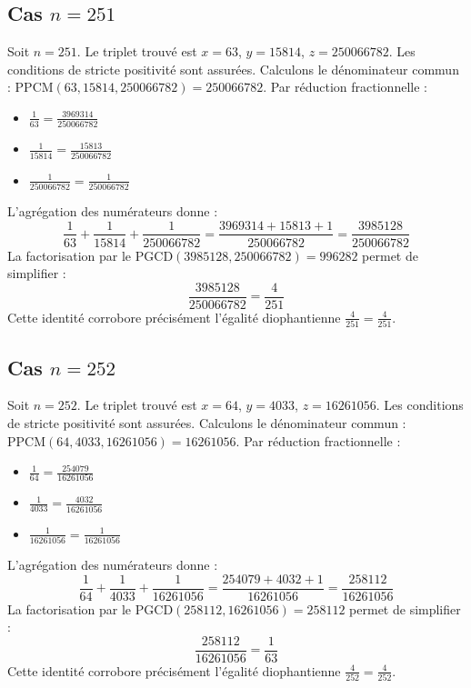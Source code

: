 \documentclass[11pt,a4paper]{article}
\begin{document}
\subsection{Cas $n = 251$}
Soit $n = 251$. Le triplet trouvé est $x = 63$, $y = 15814$, $z = 250066782$.
Les conditions de stricte positivité sont assurées.
Calculons le dénominateur commun : $\text{PPCM}(63, 15814, 250066782) = 250066782$.
Par réduction fractionnelle :
\begin{itemize}
    \item $\frac{1}{63} = \frac{3969314}{250066782}$
    \item $\frac{1}{15814} = \frac{15813}{250066782}$
    \item $\frac{1}{250066782} = \frac{1}{250066782}$
\end{itemize}
L'agrégation des numérateurs donne :
$$ \frac{1}{63} + \frac{1}{15814} + \frac{1}{250066782} = \frac{3969314 + 15813 + 1}{250066782} = \frac{3985128}{250066782} $$
La factorisation par le $\text{PGCD}(3985128, 250066782) = 996282$ permet de simplifier :
$$ \frac{3985128}{250066782} = \frac{4}{251} $$
Cette identité corrobore précisément l'égalité diophantienne $\frac{4}{251} = \frac{4}{251}$.

\subsection{Cas $n = 252$}
Soit $n = 252$. Le triplet trouvé est $x = 64$, $y = 4033$, $z = 16261056$.
Les conditions de stricte positivité sont assurées.
Calculons le dénominateur commun : $\text{PPCM}(64, 4033, 16261056) = 16261056$.
Par réduction fractionnelle :
\begin{itemize}
    \item $\frac{1}{64} = \frac{254079}{16261056}$
    \item $\frac{1}{4033} = \frac{4032}{16261056}$
    \item $\frac{1}{16261056} = \frac{1}{16261056}$
\end{itemize}
L'agrégation des numérateurs donne :
$$ \frac{1}{64} + \frac{1}{4033} + \frac{1}{16261056} = \frac{254079 + 4032 + 1}{16261056} = \frac{258112}{16261056} $$
La factorisation par le $\text{PGCD}(258112, 16261056) = 258112$ permet de simplifier :
$$ \frac{258112}{16261056} = \frac{1}{63} $$
Cette identité corrobore précisément l'égalité diophantienne $\frac{4}{252} = \frac{4}{252}$.
\end{document}
